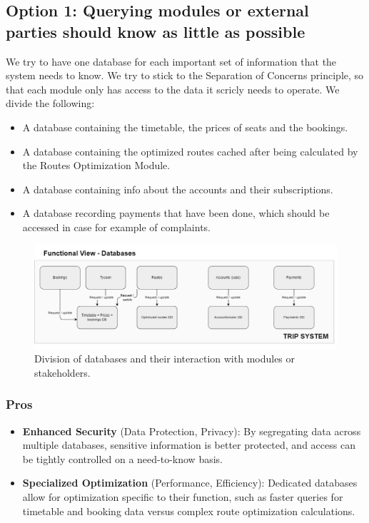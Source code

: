 \subsection*{Option 1: Querying modules or external parties should know as little as possible}
We try to have one database for each important set of information that the system needs to know.
We try to stick to the Separation of Concerns principle, so that each module only has access to the data it scricly needs to operate.
We divide the following:
\begin{itemize}
    \item A database containing the timetable, the prices of seats and the bookings.
    \item A database containing the optimized routes cached after being calculated by the Routes Optimization Module.
    \item A database containing info about the accounts and their subscriptions. 
    \item A database recording payments that have been done, which should be accessed in case for example of complaints. 
\end{itemize}
\begin{figure}[ht]
    \centering
    \includegraphics[width=\textwidth]{drawings/views_draft2/functional_view databases.png}
    \caption{Division of databases and their interaction with modules or stakeholders.}
    \label{fig:databases_view}
\end{figure}

\subsubsection*{Pros}
\begin{itemize}[noitemsep]
    \item \textbf{Enhanced Security} (Data Protection, Privacy): By segregating data across multiple databases, sensitive information is better protected, and access can be tightly controlled on a need-to-know basis.
    \item \textbf{Specialized Optimization} (Performance, Efficiency): Dedicated databases allow for optimization specific to their function, such as faster queries for timetable and booking data versus complex route optimization calculations.
\end{itemize}

